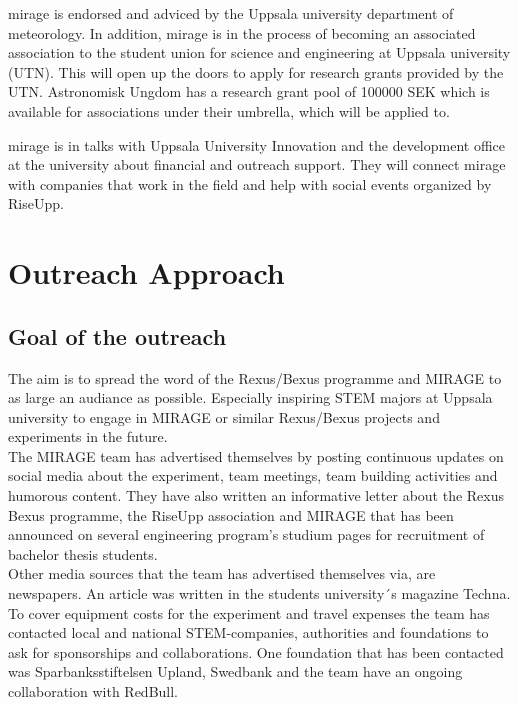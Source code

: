 \documentclass[
  a4paper,
  11pt,
  openany,
  parskip,
  toc=totoc,
  listof=totoc,
  bibliography=totoc
]{scrreprt}
\begin{document}
\gls{mirage} is endorsed and adviced by the Uppsala university department of meteorology. In addition, \gls{mirage} is in the process of becoming an associated association to the student union for science and engineering at Uppsala university (UTN). This will open up the doors to apply for research grants provided by the UTN. Astronomisk Ungdom has a research grant pool of 100000 SEK which is available for associations under their umbrella, which will be applied to.

\gls{mirage} is in talks with Uppsala University Innovation and the development office at the university about financial and outreach support. They will connect \gls{mirage} with companies that work in the field and help with social events organized by RiseUpp.


\section{Outreach Approach}
\subsection{Goal of the outreach}
The aim is to spread the word of the Rexus/Bexus programme and MIRAGE to as large an audiance as possible. Especially inspiring STEM majors at Uppsala university to engage in MIRAGE or similar Rexus/Bexus projects and experiments in the future.
\vspace{3mm}\\
The MIRAGE team has advertised themselves by posting continuous updates on social media about the experiment, team meetings, team building activities and humorous content. They have also written an informative letter about the Rexus Bexus programme, the RiseUpp association and MIRAGE that has been announced on several engineering program's studium pages for recruitment of bachelor thesis students.
\vspace{3mm}\\
Other media sources that the team has advertised themselves via, are newspapers. An article was written in the students university´s magazine Techna.
\vspace{3mm}\\
To cover equipment costs for the experiment and travel expenses the team has contacted local and national STEM-companies, authorities and foundations to ask for sponsorships and collaborations. One foundation that has been contacted was Sparbanksstiftelsen Upland, Swedbank and the team have an ongoing collaboration with RedBull.
\end{document}
